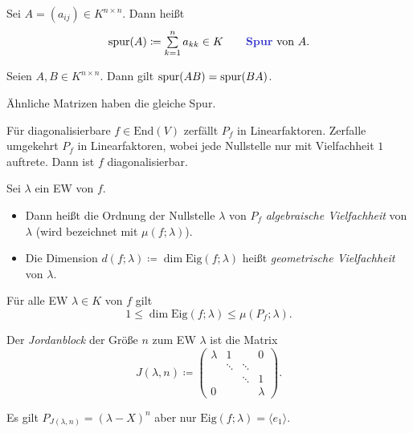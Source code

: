 \documentclass{cheat-sheet}
\newcommand{\End}{\mathrm{End}}
\newcommand{\Eig}{\mathrm{Eig}}
\begin{document}
\begin{defn}
  Sei $A = (a_{ij}) \in K^{n \times n}$. Dann heißt
  \[
    \spur(A) \coloneqq \sum_{k=1}^n a_{kk} \in K
    \qquad \text{\emph{Spur} von $A$.}
  \]
\end{defn}

\begin{satz}
  Seien $A, B \in K^{n \times n}$. Dann gilt $\mathrm{spur}(AB) = \mathrm{spur}(BA)$.
\end{satz}

\begin{kor}
  Ähnliche Matrizen haben die gleiche Spur.
\end{kor}

\begin{satz}
  Für diagonalisierbare $f \in \End(V)$ zerfällt $P_f$ in Linearfaktoren. Zerfalle umgekehrt $P_f$ in Linearfaktoren, wobei jede Nullstelle nur mit Vielfachheit $1$ auftrete. Dann ist $f$ diagonalisierbar.
\end{satz}

\begin{defn}
  Sei $\lambda$ ein EW von $f$.
  \begin{itemize}
    \item Dann heißt die Ordnung der Nullstelle $\lambda$ von $P_f$ \emph{algebraische Vielfachheit} von $\lambda$ (wird bezeichnet mit $\mu(f; \lambda)$).
    \item Die Dimension $d(f; \lambda) \coloneqq \dim \Eig(f; \lambda)$ heißt \emph{geometrische Vielfachheit} von $\lambda$.
  \end{itemize}
\end{defn}

\begin{satz}
  Für alle EW $\lambda \in K$ von $f$ gilt
  \[ 1 \le \dim \Eig(f; \lambda) \le \mu(P_f; \lambda). \]
\end{satz}

\begin{defn}
  Der \emph{Jordanblock} der Größe $n$ zum EW $\lambda$ ist die Matrix
  \[ J(\lambda, n) \coloneqq \begin{pmatrix}
    \lambda & 1 & & 0 \\
    & \ddots & \ddots & \\
    & & \ddots & 1 \\
    0 & & & \lambda
  \end{pmatrix}. \]
\end{defn}

\begin{bem}
  Es gilt $P_{J(\lambda, n)} = (\lambda - X)^n$ aber nur $\Eig(f; \lambda) = \langle e_1 \rangle$.
\end{bem}
\end{document}
